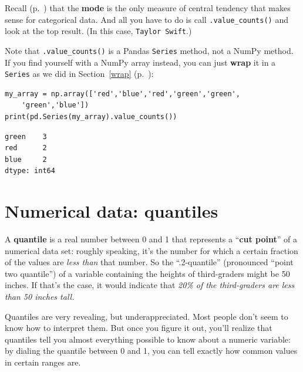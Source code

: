
Recall (p.~\pageref{mode}) that the \textbf{mode} is the only measure of
central tendency that makes sense for categorical data. And all you have to do
is call \texttt{.value\_counts()} and look at the top result. (In this case,
\texttt{Taylor Swift}.)

Note that \texttt{.value\_counts()} is a Pandas \texttt{Series} method, not a
NumPy method. If you find yourself with a NumPy array instead, you can just
\textbf{wrap} it in a \texttt{Series} as we did in Section~\ref{wrap}
(p.~\pageref{wrap}):

\begin{Verbatim}[fontsize=\small,samepage=true,frame=single,framesep=3mm]
my_array = np.array(['red','blue','red','green','green',
    'green','blue'])
print(pd.Series(my_array).value_counts())
\end{Verbatim}

\begin{Verbatim}[fontsize=\small,samepage=true,frame=leftline,framesep=5mm,framerule=1mm]
green    3
red      2
blue     2
dtype: int64
\end{Verbatim}

\section{Numerical data: quantiles}

\label{quantiles}

A \textbf{quantile} is a real number between 0 and 1 that represents a
``\textbf{cut point}'' of a numerical data set: roughly speaking, it's the
number for which a certain fraction of the values are \textit{less than} that
number. So the ``.2-quantile'' (pronounced ``point two quantile'') of a
variable containing the heights of third-graders might be 50 inches. If that's
the case, it would indicate that \textit{20\% of the third-graders are less
than 50 inches tall.}

Quantiles are very revealing, but underappreciated. Most people don't seem to
know how to interpret them. But once you figure it out, you'll realize that
quantiles tell you almost everything possible to know about a numeric variable:
by dialing the quantile between 0 and 1, you can tell exactly how common values
in certain ranges are.


